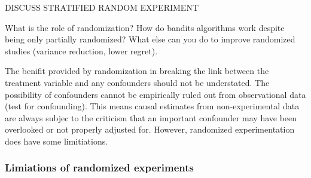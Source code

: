 \documentclass[11pt,a4paper,oneside]{book}
\begin{document}
DISCUSS STRATIFIED RANDOM EXPERIMENT

What is the role of randomization? How do bandits algorithms work despite being only partially randomized? What else can you do to improve randomized studies (variance reduction, lower regret).

The benifit provided by randomization in breaking the link between the treatment variable and any confounders should not be understated. The possibility of confounders cannot be empirically ruled out from observational data \citep{Pearl2000} (test for confounding). This means causal estimates from non-experimental data are always subjec to the criticism that an important confounder may have been overlooked or not properly adjusted for. However, randomized experimentation does have some limitiations. 

\subsubsection*{Limiations of randomized experiments}
\label{subsec:limitations_of_experiment}
\end{document}
